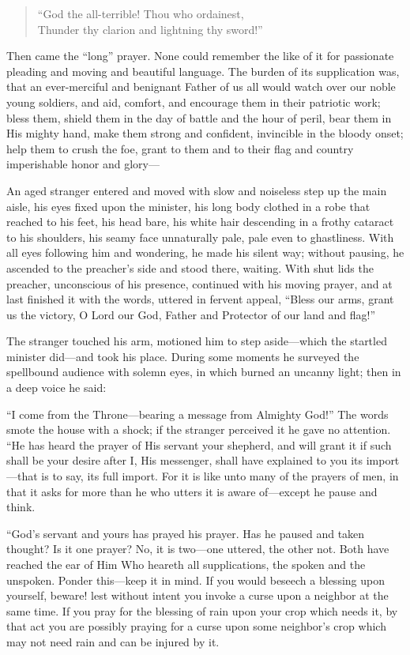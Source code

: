 \begin{verse}
``God the all-terrible! Thou who ordainest,\\
Thunder thy clarion and lightning thy sword!''
\end{verse}

\noindent Then came the ``long'' prayer. None could remember the like
of it for passionate pleading and moving and beautiful language. The
burden of its supplication was, that an ever-merciful and benignant
Father of us all would watch over our noble young soldiers, and aid,
comfort, and encourage them in their patriotic work; bless them,
shield them in the day of battle  and the hour of peril,
bear them in His mighty hand, make them strong and confident,
invincible in the bloody onset; help them to crush the foe, grant to
them and to their flag and country imperishable honor and glory---

An aged stranger entered and moved with slow and noiseless step up the
main aisle, his eyes fixed upon the minister, his long body clothed in
a robe that reached to his feet, his head bare, his white hair
descending in a frothy cataract to his shoulders, his seamy face
unnaturally pale, pale even to ghastliness. With all eyes following
him and wondering, he made his silent way; without pausing, he
ascended to the preacher's side and stood there, waiting. With shut
lids the preacher, unconscious of his presence, continued with his
moving prayer, and at last finished it with the words, uttered in
fervent appeal, ``Bless our arms, grant us the victory, O Lord our
God, Father and Protector of our land and flag!''

The stranger touched his arm, motioned him to step a\-side---which the
startled minister did---and took his place. During some moments he
surveyed the spellbound audience with solemn eyes, in which burned an
uncanny light; then in a deep voice he said:

``I come from the Throne---bear\-ing a message from Almighty God!''
The words smote the house with a shock; if the stranger perceived it
he gave no attention. ``He has heard the prayer of His servant your
shepherd, and will grant it if such shall be your desire after I, His
messenger, shall have explained to you its im\-port---that is to say,
its full import.  For it is like unto many of the prayers of
men, in that it asks for more than he who utters it is aware
of---except he pause and think.

``God's servant and yours has prayed his prayer. Has he paused and
taken thought? Is it one prayer? No, it is two---one uttered, the
other not. Both have reached the ear of Him Who heareth all
supplications, the spoken and the unspoken. Ponder this---keep it in
mind. If you would beseech a blessing upon yourself, beware! lest
without intent you invoke a curse upon a neighbor at the same time. If
you pray for the blessing of rain upon your crop which needs it, by
that act you are possibly praying for a curse upon some neighbor's
crop which may not need rain and can be injured by it.

